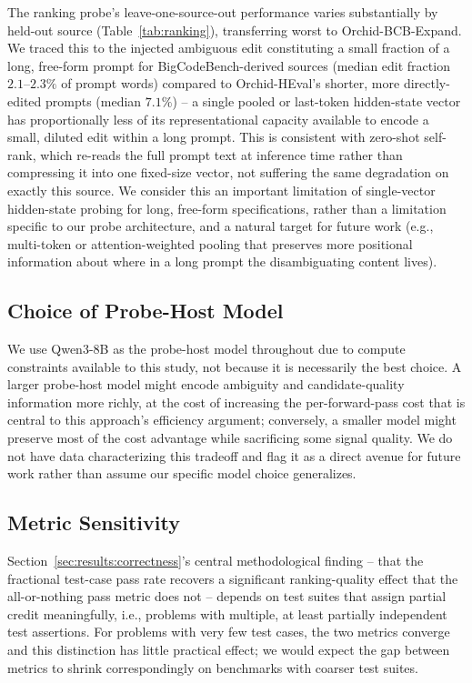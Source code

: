 The ranking probe's leave-one-source-out performance varies substantially
by held-out source (Table~\ref{tab:ranking}), transferring worst to
Orchid-BCB-Expand. We traced this to the injected ambiguous edit
constituting a small fraction of a long, free-form prompt for
BigCodeBench-derived sources (median edit fraction $2.1$--$2.3\%$ of
prompt words) compared to Orchid-HEval's shorter, more directly-edited
prompts (median $7.1\%$) -- a single pooled or last-token hidden-state
vector has proportionally less of its representational capacity available
to encode a small, diluted edit within a long prompt. This is consistent
with zero-shot self-rank, which re-reads the full prompt text at inference
time rather than compressing it into one fixed-size vector, not suffering
the same degradation on exactly this source. We consider this an
important limitation of single-vector hidden-state probing for long,
free-form specifications, rather than a limitation specific to our probe
architecture, and a natural target for future work (e.g., multi-token or
attention-weighted pooling that preserves more positional information about
where in a long prompt the disambiguating content lives).

\subsection{Choice of Probe-Host Model}

We use Qwen3-8B as the probe-host model throughout due to compute
constraints available to this study, not because it is necessarily the
best choice. A larger probe-host model might encode ambiguity and
candidate-quality information more richly, at the cost of increasing the
per-forward-pass cost that is central to this approach's efficiency
argument; conversely, a smaller model might preserve most of the cost
advantage while sacrificing some signal quality. We do not have data
characterizing this tradeoff and flag it as a direct avenue for future
work rather than assume our specific model choice generalizes.

\subsection{Metric Sensitivity}

Section~\ref{sec:results:correctness}'s central methodological finding --
that the fractional test-case pass rate recovers a significant
ranking-quality effect that the all-or-nothing pass metric does not --
depends on test suites that assign partial credit meaningfully, i.e.,
problems with multiple, at least partially independent test assertions.
For problems with very few test cases, the two metrics converge and this
distinction has little practical effect; we would expect the gap between
metrics to shrink correspondingly on benchmarks with coarser test suites.

